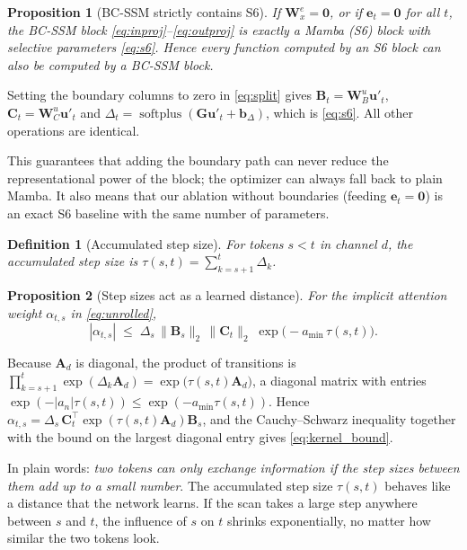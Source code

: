 \documentclass[journal]{IEEEtran}
\newtheorem{proposition}{Proposition}
\newtheorem{definition}{Definition}
\newcommand{\vect}[1]{\bm{#1}}
\newcommand{\softplus}{\operatorname{softplus}}
\newcommand{\Dt}{\Delta}
\begin{document}
\begin{proposition}[BC-SSM strictly contains S6]
\label{prop:reduction}
If $\vect{W}_x^{e}=\vect{0}$, or if $\vect{e}_t=\vect{0}$ for all $t$, the BC-SSM block \eqref{eq:inproj}--\eqref{eq:outproj} is exactly a Mamba (S6) block with selective parameters \eqref{eq:s6}. Hence every function computed by an S6 block can also be computed by a BC-SSM block.
\end{proposition}
\begin{IEEEproof}
Setting the boundary columns to zero in \eqref{eq:split} gives $\vect{B}_t=\vect{W}_B^{u}\vect{u}'_t$, $\vect{C}_t=\vect{W}_C^{u}\vect{u}'_t$ and $\Dt_t=\softplus(\vect{G}\vect{u}'_t+\vect{b}_\Dt)$, which is \eqref{eq:s6}. All other operations are identical.
\end{IEEEproof}
This guarantees that adding the boundary path can never reduce the representational power of the block; the optimizer can always fall back to plain Mamba. It also means that our ablation without boundaries (feeding $\vect{e}_t=\vect{0}$) is an exact S6 baseline with the same number of parameters.

\begin{definition}[Accumulated step size]
For tokens $s<t$ in channel $d$, the accumulated step size is $\tau(s,t)=\sum_{k=s+1}^{t}\Dt_{k}$.
\end{definition}

\begin{proposition}[Step sizes act as a learned distance]
\label{prop:kernel}
For the implicit attention weight $\alpha_{t,s}$ in \eqref{eq:unrolled},
\begin{equation}
  |\alpha_{t,s}| \;\le\; \Dt_{s}\,\|\vect{B}_s\|_2\,\|\vect{C}_t\|_2\;\exp\!\big(-a_{\min}\,\tau(s,t)\big).
  \label{eq:kernel_bound}
\end{equation}
\end{proposition}
\begin{IEEEproof}
Because $\vect{A}_d$ is diagonal, the product of transitions is $\prod_{k=s+1}^{t}\exp(\Dt_{k}\vect{A}_d)=\exp\big(\tau(s,t)\vect{A}_d\big)$, a diagonal matrix with entries $\exp(-|a_{n}|\tau(s,t))\le\exp(-a_{\min}\tau(s,t))$. Hence $\alpha_{t,s}=\Dt_{s}\,\vect{C}_t^{\top}\exp(\tau(s,t)\vect{A}_d)\vect{B}_s$, and the Cauchy--Schwarz inequality together with the bound on the largest diagonal entry gives \eqref{eq:kernel_bound}.
\end{IEEEproof}
In plain words: \emph{two tokens can only exchange information if the step sizes between them add up to a small number}. The accumulated step size $\tau(s,t)$ behaves like a distance that the network learns. If the scan takes a large step anywhere between $s$ and $t$, the influence of $s$ on $t$ shrinks exponentially, no matter how similar the two tokens look.
\end{document}
